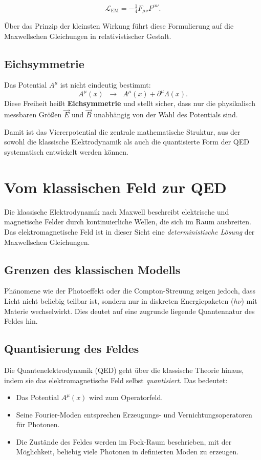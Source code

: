 \[
\mathcal{L}_{\text{EM}} = - \tfrac{1}{4} F_{\mu\nu} F^{\mu\nu} .
\]

Über das Prinzip der kleinsten Wirkung führt diese Formulierung auf die 
Maxwellschen Gleichungen in relativistischer Gestalt.

\subsection*{Eichsymmetrie}
Das Potential \( A^\mu \) ist nicht eindeutig bestimmt:
\[
A^\mu(x) \;\;\rightarrow\;\; A^\mu(x) + \partial^\mu \Lambda(x).
\]
Diese Freiheit heißt \textbf{Eichsymmetrie} und stellt sicher, dass nur
die physikalisch messbaren Größen \( \vec{E} \) und \( \vec{B} \) 
unabhängig von der Wahl des Potentials sind.

\medskip
Damit ist das Viererpotential die zentrale mathematische Struktur, aus der
sowohl die klassische Elektrodynamik als auch die quantisierte Form der QED
systematisch entwickelt werden können.
\section{Vom klassischen Feld zur QED}
\label{anhangA:feld_zu_qed}

Die klassische Elektrodynamik nach Maxwell beschreibt elektrische und 
magnetische Felder durch kontinuierliche Wellen, die sich im Raum ausbreiten. 
Das elektromagnetische Feld ist in dieser Sicht eine 
\emph{deterministische Lösung} der Maxwellschen Gleichungen. 

\subsection*{Grenzen des klassischen Modells}
Phänomene wie der Photoeffekt oder die Compton-Streuung zeigen jedoch,
dass Licht nicht beliebig teilbar ist, sondern nur in diskreten 
Energiepaketen (\( h\nu \)) mit Materie wechselwirkt. 
Dies deutet auf eine zugrunde liegende Quantennatur des Feldes hin.

\subsection*{Quantisierung des Feldes}
Die Quantenelektrodynamik (QED) geht über die klassische Theorie hinaus, 
indem sie das elektromagnetische Feld selbst \emph{quantisiert}. 
Das bedeutet:
\begin{itemize}
	\item Das Potential \( A^\mu(x) \) wird zum Operatorfeld.
	\item Seine Fourier-Moden entsprechen Erzeugungs- und Vernichtungsoperatoren 
	für Photonen.
	\item Die Zustände des Feldes werden im Fock-Raum beschrieben, 
	mit der Möglichkeit, beliebig viele Photonen in definierten 
	Moden zu erzeugen.
\end{itemize}

